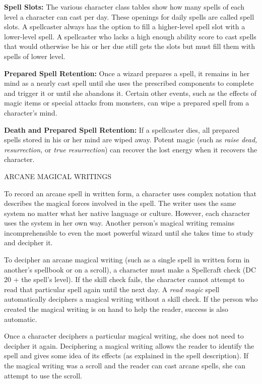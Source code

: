 \documentclass{article}
\begin{document}
\textbf{Spell Slots:} The various character class tables show how many spells of 
each level a character can cast per day. These openings for daily spells are called 
spell slots. A spellcaster always has the option to fill a higher-level spell slot 
with a lower-level spell. A spellcaster who lacks a high enough ability score to 
cast spells that would otherwise be his or her due still gets the slots but must 
fill them with spells of lower level.

\textbf{Prepared Spell Retention:} Once a wizard prepares a spell, it remains in 
her mind as a nearly cast spell until she uses the prescribed components to complete 
and trigger it or until she abandons it. Certain other events, such as the effects 
of magic items or special attacks from monsters, can wipe a prepared spell from 
a character's mind.

\textbf{Death and Prepared Spell Retention:} If a spellcaster dies, all prepared 
spells stored in his or her mind are wiped away. Potent magic (such as \textit{raise 
dead, resurrection, }or \textit{true resurrection}) can recover the lost energy 
when it recovers the character.

\vspace{12pt}
ARCANE MAGICAL WRITINGS

To record an arcane spell in written form, a character uses complex notation that 
describes the magical forces involved in the spell. The writer uses the same system 
no matter what her native language or culture. However, each character uses the 
system in her own way. Another person's magical writing remains incomprehensible 
to even the most powerful wizard until she takes time to study and decipher it.

To decipher an arcane magical writing (such as a single spell in written form in 
another's spellbook or on a scroll), a character must make a Spellcraft check (DC 
20 + the spell's level). If the skill check fails, the character cannot attempt 
to read that particular spell again until the next day. A \textit{read magic }spell 
automatically deciphers a magical writing without a skill check. If the person 
who created the magical writing is on hand to help the reader, success is also 
automatic.

Once a character deciphers a particular magical writing, she does not need to decipher 
it again. Deciphering a magical writing allows the reader to identify the spell 
and gives some idea of its effects (as explained in the spell description). If 
the magical writing was a scroll and the reader can cast arcane spells, she can 
attempt to use the scroll.
\end{document}

